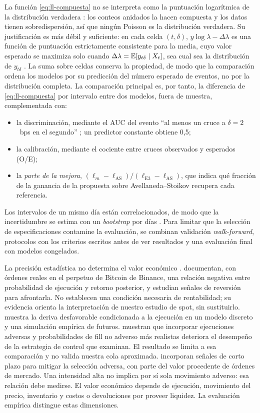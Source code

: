 La función \eqref{eq:ll-compuesta} no se interpreta como la puntuación logarítmica de la distribución verdadera \citep{GneitingRaftery2007}: los conteos anidados la hacen compuesta y los datos tienen sobredispersión, así que ningún Poisson es la distribución verdadera. Su justificación es más débil y suficiente: en cada celda $(t,\delta)$, $y\log\lambda-\Delta\lambda$ es una función de puntuación estrictamente consistente para la media, cuyo valor esperado se maximiza solo cuando $\Delta\lambda=\operatorname{\mathbb{E}}[y_{t\delta}\mid X_t]$, sea cual sea la distribución de $y_{t\delta}$ \citep{Gneiting2011}. La suma sobre celdas conserva la propiedad, de modo que la comparación ordena los modelos por su predicción del número esperado de eventos, no por la distribución completa. La comparación principal es, por tanto, la diferencia de \eqref{eq:ll-compuesta} por intervalo entre dos modelos, fuera de muestra, complementada con:
\begin{itemize}[nosep]
\item la discriminación, mediante el AUC del evento ``al menos un cruce a $\delta=2$~bps en el segundo'' \citep{Fawcett2006}; un predictor constante obtiene 0,5;
\item la calibración, mediante el cociente entre cruces observados y esperados (O/E);
\item la \emph{parte de la mejora}, $(\ell_m-\ell_{\text{AS}})/(\ell_{\text{E3}}-\ell_{\text{AS}})$, que indica qué fracción de la ganancia de la propuesta sobre Avellaneda--Stoikov recupera cada referencia.
\end{itemize}
Los intervalos de un mismo día están correlacionados, de modo que la incertidumbre se estima con un \textit{bootstrap} por días \citep{EfronTibshirani1993}. Para limitar que la selección de especificaciones contamine la evaluación, se combinan validación \textit{walk-forward}, protocolos con los criterios escritos antes de ver resultados y una evaluación final con modelos congelados.

La precisión estadística no determina el valor económico \citep{LeitchTanner1991}. \citet{AlbersEtAl2025} documentan, con órdenes reales en el perpetuo de Bitcoin de Binance, una relación negativa entre probabilidad de ejecución y retorno posterior, y estudian señales de reversión para afrontarla. No establecen una condición necesaria de rentabilidad; su evidencia orienta la interpretación de nuestro estudio de spot, sin sustituirlo. \citet{DeLise2024} muestra la deriva desfavorable condicionada a la ejecución en un modelo discreto y una simulación empírica de futuros. \citet{LalorSwishchuk2024} muestran que incorporar ejecuciones adversas y probabilidades de fill no adverso más realistas deteriora el desempeño de la estrategia de control que examinan. El resultado se limita a esa comparación y no valida nuestra cola aproximada. \citet{CarteaWang2020} incorporan señales de corto plazo para mitigar la selección adversa, con parte del valor procedente de órdenes de mercado. Una intensidad alta no implica por sí sola movimiento adverso: esa relación debe medirse. El valor económico depende de ejecución, movimiento del precio, inventario \citep{Menkveld2013} y costos o devoluciones por proveer liquidez. La evaluación empírica distingue estas dimensiones.
